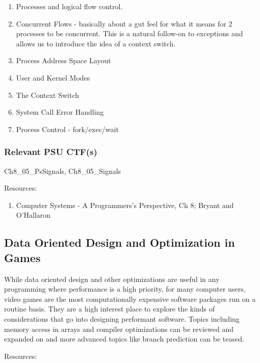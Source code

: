 \documentclass[12pt,letterpaper]{article}
\begin{document}
	\begin{enumerate}
		\item Processes and logical flow control.
		\item Concurrent Flows - basically about a gut feel for what it means for 2 processes to be concurrent.  This is a natural follow-on to exceptions and allows us to introduce the idea of a context switch.
		\item Process Address Space Layout
		\item User and Kernel Modes
		\item The Context Switch
		\item System Call Error Handling
		\item Process Control - fork/exec/wait
	\end{enumerate}

	\subsubsection*{Relevant PSU CTF(s)}

	Ch8\_05\_PsSignals, Ch8\_05\_Signals

	Resources:

	\begin{enumerate}
		\item Computer Systems - A Programmers's Perspective, Ch 8; Bryant and O'Hallaron
	\end{enumerate}
	
	\subsection{Data Oriented Design and Optimization in Games}

	While data oriented design and other optimizations are useful in any programming where performance is a high priority, for many computer users, video games are the most computationally expensive software packages run on a routine basis. They are a high interest place to explore the kinds of considerations that go into designing performant software. Topics including memory access in arrays and compiler optimizations can be reviewed and expanded on and more advanced topics like branch prediction can be teased.

	Resources:
	
\end{document}
